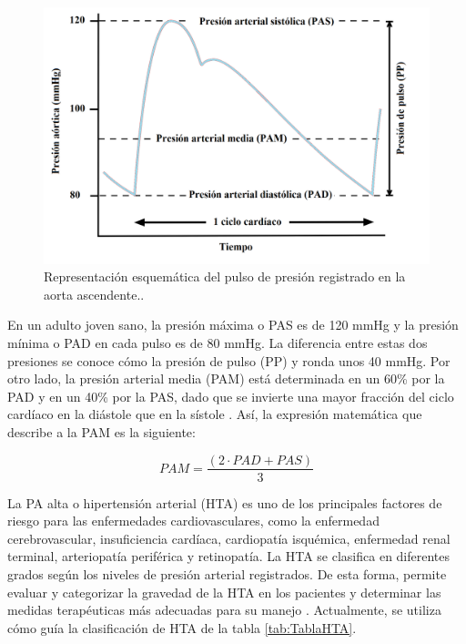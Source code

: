 \begin{figure}[h]
  \centering
  \includegraphics[width=\textwidth]{./Figures/aortic-pulse-pressure.png}
  \caption{Representación esquemática del pulso de presión registrado en la aorta ascendente.\protect\footnotemark.}\label{fig:aorticPulse}
\end{figure}


En un adulto joven sano, la presión máxima o PAS es de 
120 mmHg y la presión mínima o PAD en cada pulso es de 80 mmHg. La diferencia entre estas dos presiones 
se conoce cómo la presión de pulso (PP) y ronda unos 40 mmHg. Por otro lado, la presión arterial media (PAM) 
está determinada en un 60\% por la PAD y en un 40\% por la PAS, dado que se invierte una mayor fracción 
del ciclo cardíaco en la diástole que en la sístole \citep{CITE:2} \citep{CITE:3}. Así, la expresión matemática que describe 
a la PAM es la siguiente: 

\begin{equation}
	\label{eq:PAM}
	PAM = \frac{(2 \cdot PAD + PAS)}{3}
\end{equation}

La PA alta o hipertensión arterial (HTA) es uno de los principales factores de riesgo para las enfermedades 
cardiovasculares, como la enfermedad cerebrovascular, insuficiencia cardíaca, cardiopatía isquémica, 
enfermedad renal terminal, arteriopatía periférica y retinopatía. 
La HTA se clasifica en diferentes grados según los niveles de presión arterial registrados. 
De esta forma, permite evaluar y categorizar la gravedad de la HTA en los pacientes y determinar las medidas 
terapéuticas más adecuadas para su manejo \citep{CITE:6} \citep{CITE:7}. 
Actualmente, se utiliza cómo guía la clasificación de HTA de la tabla \ref{tab:TablaHTA}.

